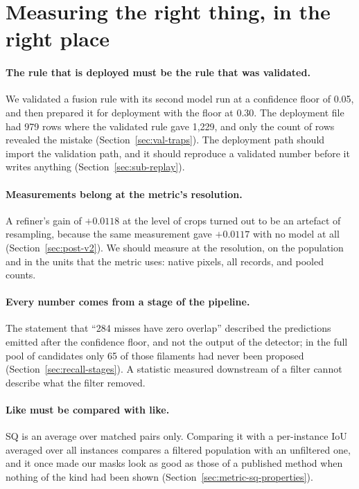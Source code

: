 \section{Measuring the right thing, in the right place}\label{sec:lessons-measure}

\paragraph{The rule that is deployed must be the rule that was validated.} We validated a fusion rule
with its second model run at a confidence floor of 0.05, and then prepared it for deployment with the
floor at 0.30. The deployment file had 979 rows where the validated rule gave 1,229, and only the count
of rows revealed the mistake (Section~\ref{sec:val-traps}). The deployment path should import the
validation path, and it should reproduce a validated number before it writes anything
(Section~\ref{sec:sub-replay}).

\paragraph{Measurements belong at the metric's resolution.} A refiner's gain of $+0.0118$ at the level
of crops turned out to be an artefact of resampling, because the same measurement gave $+0.0117$ with
no model at all (Section~\ref{sec:post-v2}). We should measure at the resolution, on the population and
in the units that the metric uses: native pixels, all records, and pooled counts.

\paragraph{Every number comes from a stage of the pipeline.} The statement that ``284 misses have zero
overlap'' described the predictions emitted after the confidence floor, and not the output of the
detector; in the full pool of candidates only 65 of those filaments had never been proposed
(Section~\ref{sec:recall-stages}). A statistic measured downstream of a filter cannot describe what the
filter removed.

\paragraph{Like must be compared with like.} SQ is an average over matched pairs only. Comparing it with
a per-instance IoU averaged over all instances compares a filtered population with an unfiltered one, and
it once made our masks look as good as those of a published method when nothing of the kind had been
shown (Section~\ref{sec:metric-sq-properties}).

